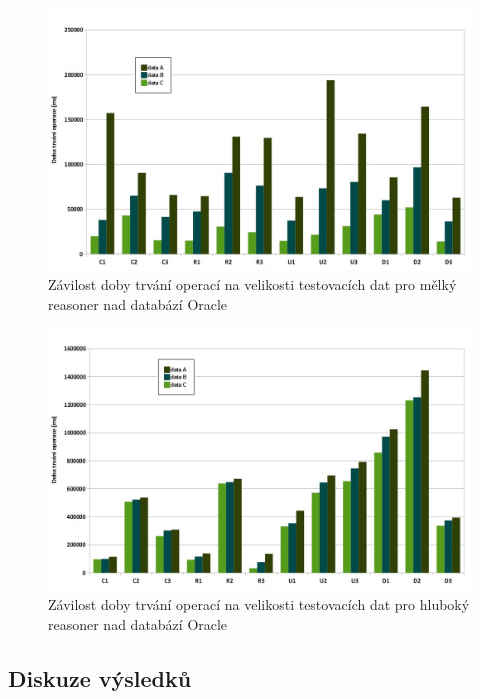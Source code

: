 \documentclass{projekt}
\begin{document}
\begin{figure}[htb!]
\begin{center}
\includegraphics[scale=0.45]{oracleShallow.jpg}
\caption{Závilost doby trvání operací na velikosti testovacích dat pro mělký reasoner nad databází Oracle}
\end{center}
\end{figure}


\begin{figure}[htb!]
\begin{center}
\includegraphics[scale=0.45]{oracleDeep.jpg}
\caption{Závilost doby trvání operací na velikosti testovacích dat pro hluboký reasoner nad databází Oracle}
\end{center}
\end{figure}

\newpage



\subsection{Diskuze výsledků}
\end{document}
